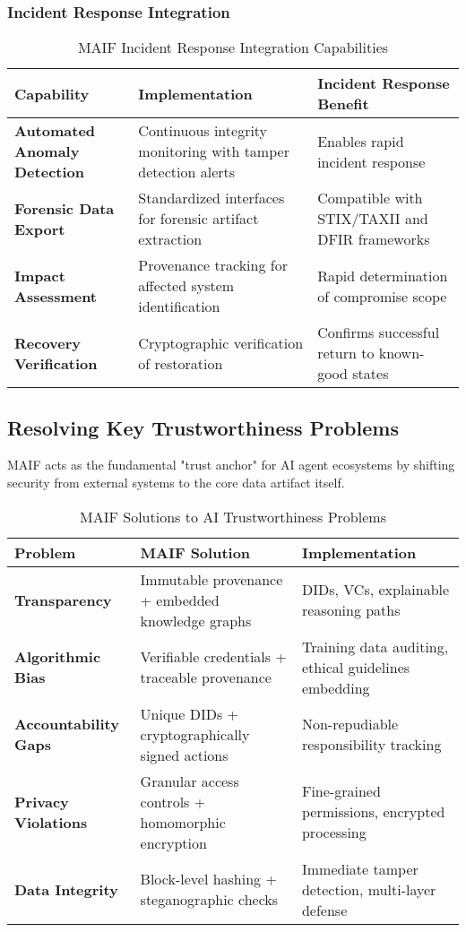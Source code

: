 \documentclass[conference]{IEEEtran}
\begin{document}
\subsubsection{Incident Response Integration}

\begin{table*}[!t]
\renewcommand{\arraystretch}{1.3}
\caption{MAIF Incident Response Integration Capabilities}
\label{tab:incident-response}
\centering
\footnotesize
\begin{tabular}{p{3cm}p{6cm}p{5cm}}
\toprule
\textbf{Capability} & \textbf{Implementation} & \textbf{Incident Response Benefit} \\
\midrule
\textbf{Automated Anomaly Detection} & Continuous integrity monitoring with tamper detection alerts & Enables rapid incident response \\
\textbf{Forensic Data Export} & Standardized interfaces for forensic artifact extraction & Compatible with STIX/TAXII and DFIR frameworks \\
\textbf{Impact Assessment} & Provenance tracking for affected system identification & Rapid determination of compromise scope \\
\textbf{Recovery Verification} & Cryptographic verification of restoration & Confirms successful return to known-good states \\
\bottomrule
\end{tabular}
\end{table*}

\subsection{Resolving Key Trustworthiness Problems}

MAIF acts as the fundamental "trust anchor" for AI agent ecosystems by shifting security from external systems to the core data artifact itself.

\begin{table*}[!t]
\renewcommand{\arraystretch}{1.3}
\caption{MAIF Solutions to AI Trustworthiness Problems}
\label{tab:trustworthiness-solutions}
\centering
\footnotesize
\begin{tabular}{p{3cm}p{5.5cm}p{5.5cm}}
\toprule
\textbf{Problem} & \textbf{MAIF Solution} & \textbf{Implementation} \\
\midrule
\textbf{Transparency} & Immutable provenance + embedded knowledge graphs & DIDs, VCs, explainable reasoning paths \\
\textbf{Algorithmic Bias} & Verifiable credentials + traceable provenance & Training data auditing, ethical guidelines embedding \\
\textbf{Accountability Gaps} & Unique DIDs + cryptographically signed actions & Non-repudiable responsibility tracking \\
\textbf{Privacy Violations} & Granular access controls + homomorphic encryption & Fine-grained permissions, encrypted processing \\
\textbf{Data Integrity} & Block-level hashing + steganographic checks & Immediate tamper detection, multi-layer defense \\
\bottomrule
\end{tabular}
\end{table*}
\end{document}
